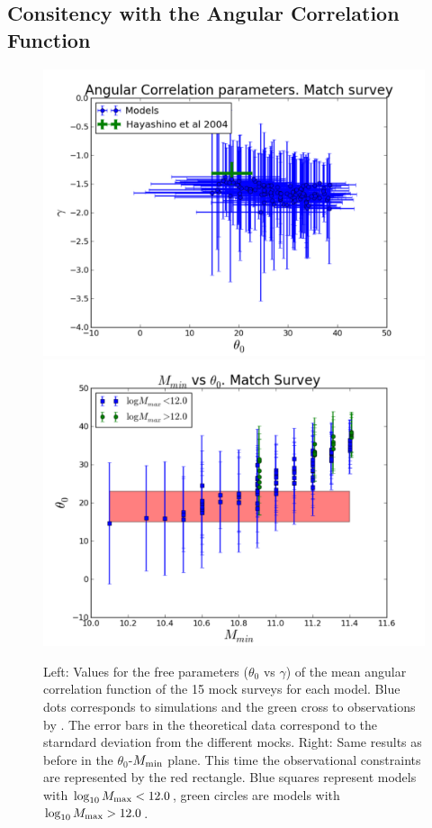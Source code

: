 \documentclass[usenatbib]{mn2e}
\begin{document}
\subsection{Consitency with the Angular Correlation Function}



\begin{figure}
\begin{center}
\includegraphics[width=0.46\linewidth,angle=0]{./plots/power_law_correlation.pdf} 
\hspace{5mm}  
\includegraphics[width=0.46\linewidth,angle=0]{./plots/mmin_vs_correlation.pdf} 
\end{center}
\caption{Left: Values for the free parameters ($\theta_{0}$ vs $\gamma$) of the 
mean angular correlation function of the 15 mock surveys for each
model. Blue dots corresponds to simulations and the green cross to
observations by \citet{Hayashino2004}. The error bars in the
theoretical data correspond to the starndard deviation from the
different mocks. Right: Same results as before in the
$\theta_{0}$-$M_{\rm min}$ plane. This time the observational
constraints are represented by the red rectangle. Blue squares
represent models with $\log_{10} M_{\rm  max}<12.0$, green circles are
models with $\log_{10} M_{\rm max}>12.0$.
\label{figure:correlation_parameters}}
\end{figure} 
\end{document}
